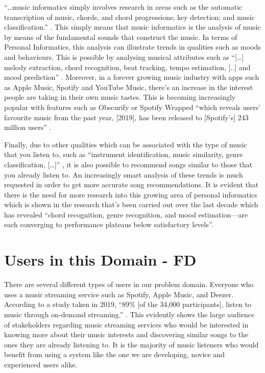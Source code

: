 \documentclass[10pt]{report}
\begin{document}
“…music informatics simply involves research in areas such as the automatic transcription of music, chords, and chord progressions; key detection; and music classification.” \cite{Paas2013}. This simply means that music informatics is the analysis of music by means of the fundamental sounds that construct the music. In terms of Personal Informatics, this analysis can illustrate trends in qualities such as moods and behaviours. This is possible by analysing musical attributes such as “[…] melody extraction, chord recognition, beat tracking, tempo estimation, [..] and mood prediction” \cite{Humphrey2013}.
Moreover, in a forever growing music industry with apps such as Apple Music, Spotify and YouTube Music, there’s an increase in the interest people are taking in their own music tastes. This is becoming increasingly popular with features such as Obscurify or Spotify Wrapped “which reveals users’ favourite music from the past year, [2019], has been released to [Spotify’s] 243 million users” \cite{Izzard2019}.

Finally, due to other qualities which can be associated with the type of music that you listen to, such as “instrument identification, music similarity, genre classification, […]” \cite{Humphrey2013}, it is also possible to recommend songs similar to those that you already listen to. An increasingly smart analysis of these trends is much requested in order to get more accurate song recommendations. It is evident that there is the need for more research into this growing area of personal informatics which is shown in the research that’s been carried out over the last decade which has revealed “chord recognition, genre recognition, and mood estimation—are each converging to performance plateaus below satisfactory levels”\cite{Humphrey2013}.

\section{Users in this Domain - FD}

There are several different types of users in our problem domain. Everyone who uses a music streaming service such as Spotify, Apple Music, and Deezer. According to a study taken in 2019, “89\% [of the 34,000 participants], listen to music through on-demand streaming.” \cite{IFPI2019}. This evidently shows the large audience of stakeholders regarding music streaming services who would be interested in knowing more about their music interests and discovering similar songs to the ones they are already listening to. It is the majority of music listeners who would benefit from using a system like the one we are developing, novice and experienced users alike.
\end{document}
